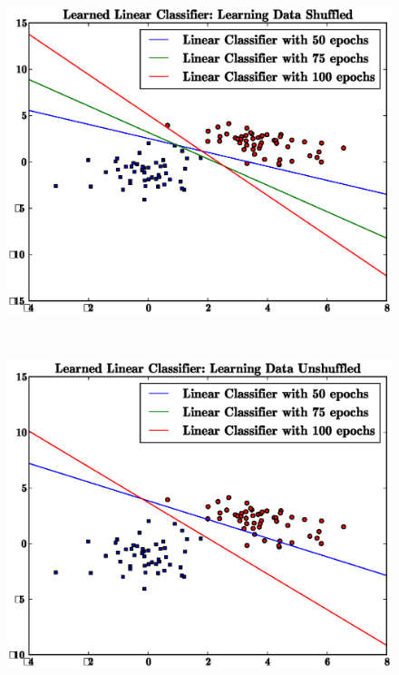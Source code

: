 \documentclass[letterpaper,10pt,titlepage]{article}
\begin{document}
\\[5mm] 
\pagebreak
\begin{figure}[th!]
\centering
\includegraphics[width=5in]{shuffled.eps} 
\end{figure} 
\\[5mm] 
\begin{figure}[th!]
\centering
\includegraphics[width=5in]{unshuffled.eps} 
\end{figure} 
\\[5mm]
\pagebreak
\end{document}
